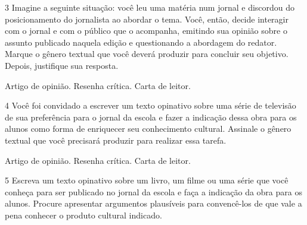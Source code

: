 \num{3} Imagine a seguinte situação: você leu uma matéria num jornal e discordou do posicionamento do
jornalista ao abordar o tema. Você, então, decide interagir com o jornal
e com o público que o acompanha, emitindo sua opinião sobre o assunto
publicado naquela edição e questionando a abordagem do
redator. Marque o gênero textual que você deverá produzir para concluir
seu objetivo. Depois, justifique sua resposta.

\begin{boxlist}[itemsep=-5pt]
 Artigo de opinião.
 Resenha crítica.
 Carta de leitor.
\end{boxlist}


\num{4} Você foi convidado a escrever um texto opinativo sobre uma série
de televisão de sua preferência para o jornal da escola e fazer a
indicação dessa obra para os alunos como forma de enriquecer seu
conhecimento cultural. Assinale o gênero textual que você precisará
produzir para realizar essa tarefa. %

\begin{boxlist}[itemsep=-5pt]
 Artigo de opinião.
 Resenha crítica.
 Carta de leitor.
\end{boxlist}


\pagebreak

\num{5} Escreva um texto opinativo sobre um livro, um filme ou uma série
que você conheça para ser publicado no jornal da escola e faça a
indicação da obra para os alunos. Procure apresentar argumentos
plausíveis para convencê-los de que vale a pena conhecer o produto cultural indicado.


